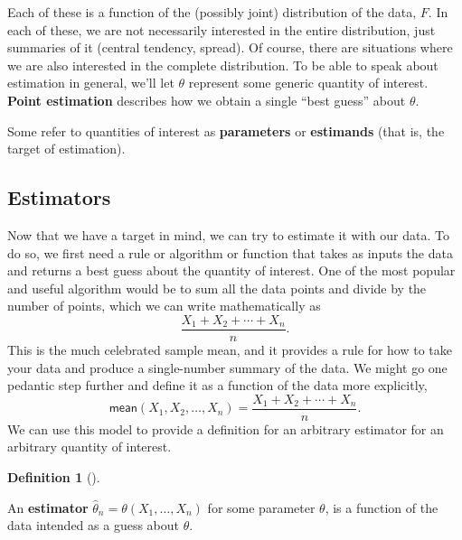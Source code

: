 \documentclass[
  letterpaper,
  DIV=11,
  numbers=noendperiod]{scrreprt}
\theoremstyle{definition}
\theoremstyle{definition}
\newtheorem{definition}{Definition}[chapter]
\theoremstyle{plain}
\theoremstyle{remark}
\begin{document}
Each of these is a function of the (possibly joint) distribution of the
data, \(F\). In each of these, we are not necessarily interested in the
entire distribution, just summaries of it (central tendency, spread). Of
course, there are situations where we are also interested in the
complete distribution. To be able to speak about estimation in general,
we'll let \(\theta\) represent some generic quantity of interest.
\textbf{Point estimation} describes how we obtain a single ``best
guess'' about \(\theta\).

\begin{tcolorbox}[enhanced jigsaw, colframe=quarto-callout-note-color-frame, rightrule=.15mm, colback=white, breakable, opacityback=0, coltitle=black, opacitybacktitle=0.6, arc=.35mm, left=2mm, leftrule=.75mm, toptitle=1mm, colbacktitle=quarto-callout-note-color!10!white, titlerule=0mm, title=\textcolor{quarto-callout-note-color}{\faInfo}\hspace{0.5em}{Note}, bottomrule=.15mm, bottomtitle=1mm, toprule=.15mm]

Some refer to quantities of interest as \textbf{parameters} or
\textbf{estimands} (that is, the target of estimation).

\end{tcolorbox}

\hypertarget{estimators}{%
\subsection{Estimators}\label{estimators}}

Now that we have a target in mind, we can try to estimate it with our
data. To do so, we first need a rule or algorithm or function that takes
as inputs the data and returns a best guess about the quantity of
interest. One of the most popular and useful algorithm would be to sum
all the data points and divide by the number of points, which we can
write mathematically as \[
\frac{X_1 + X_2 + \cdots + X_n}{n}.
\] This is the much celebrated sample mean, and it provides a rule for
how to take your data and produce a single-number summary of the data.
We might go one pedantic step further and define it as a function of the
data more explicitly, \[
\textsf{mean}(X_1, X_2, \ldots, X_n) = \frac{X_1 + X_2 + \cdots + X_n}{n}.
\] We can use this model to provide a definition for an arbitrary
estimator for an arbitrary quantity of interest.

\begin{definition}[]\protect\hypertarget{def-estimator}{}\label{def-estimator}

An \textbf{estimator} \(\widehat{\theta}_n = \theta(X_1, \ldots, X_n)\)
for some parameter \(\theta\), is a function of the data intended as a
guess about \(\theta\).

\end{definition}
\end{document}
